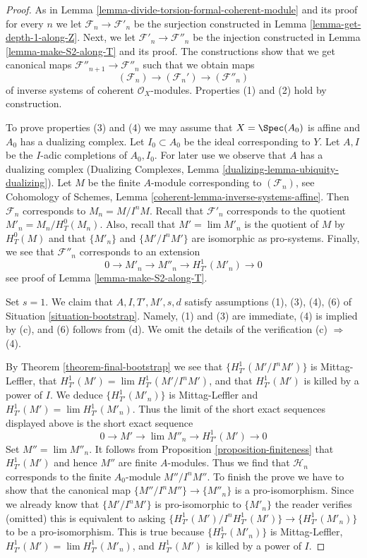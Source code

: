 \begin{proof}
As in Lemma \ref{lemma-divide-torsion-formal-coherent-module} and its proof
for every $n$ we let $\mathcal{F}_n \to \mathcal{F}'_n$ be the surjection
constructed in Lemma \ref{lemma-get-depth-1-along-Z}.
Next, we let $\mathcal{F}'_n \to \mathcal{F}''_n$ be the injection
constructed in Lemma \ref{lemma-make-S2-along-T} and its proof.
The constructions show that we get canonical maps
$\mathcal{F}''_{n + 1} \to \mathcal{F}''_n$ such that we obtain
maps
$$
(\mathcal{F}_n) \longrightarrow (\mathcal{F}_n') \longrightarrow
(\mathcal{F}''_n)
$$
of inverse systems of coherent $\mathcal{O}_X$-modules.
Properties (1) and (2) hold by construction.

\medskip\noindent
To prove properties (3) and (4) we may assume that $X = \Spec(A_0)$ is
affine and $A_0$ has a dualizing complex. Let $I_0 \subset A_0$ be the
ideal corresponding to $Y$. Let $A, I$ be the $I$-adic completions of
$A_0, I_0$. For later use we observe that $A$ has a dualizing complex
(Dualizing Complexes, Lemma \ref{dualizing-lemma-ubiquity-dualizing}).
Let $M$ be the finite $A$-module corresponding to $(\mathcal{F}_n)$, see
Cohomology of Schemes, Lemma \ref{coherent-lemma-inverse-systems-affine}.
Then $\mathcal{F}_n$ corresponds to $M_n = M/I^nM$. Recall that
$\mathcal{F}'_n$ corresponds to the quotient $M'_n = M_n / H^0_T(M_n)$.
Also, recall that $M' = \lim M'_n$ is the quotient of $M$ by
$H^0_T(M)$ and that $\{M'_n\}$ and $\{M'/I^nM'\}$ are isomorphic
as pro-systems. Finally, we see that $\mathcal{F}''_n$ corresponds
to an extension
$$
0 \to M'_n \to M''_n \to H^1_{T'}(M'_n) \to 0
$$
see proof of Lemma \ref{lemma-make-S2-along-T}.

\medskip\noindent
Set $s = 1$. We claim that $A, I, T', M', s, d$ satisfy assumptions
(1), (3), (4), (6) of Situation \ref{situation-bootstrap}. Namely, (1) and (3)
are immediate, (4) is implied by (c), and (6) follows from (d).
We omit the details of the verification (c) $\Rightarrow$ (4).

\medskip\noindent
By Theorem \ref{theorem-final-bootstrap} we see that $\{H^1_{T'}(M'/I^nM')\}$
is Mittag-Leffler, that $H^1_{T'}(M') = \lim H^1_{T'}(M'/I^nM')$, and that
$H^1_{T'}(M')$ is killed by a power of $I$. We deduce
$\{H^1_{T'}(M'_n)\}$ is Mittag-Leffler and $H^1_{T'}(M') = \lim H^1_{T'}(M'_n)$.
Thus the limit of the short exact sequences displayed above
is the short exact sequence
$$
0 \to M' \to \lim M''_n \to H^1_{T'}(M') \to 0
$$
Set $M'' = \lim M''_n$. It follows from
Proposition \ref{proposition-finiteness} that $H^1_{T'}(M')$
and hence $M''$ are finite $A$-modules.
Thus we find that $\mathcal{H}_n$ corresponds to
the finite $A_0$-module $M''/I^nM''$. To finish the prove we have to show
that the canonical map $\{M''/I^nM''\} \to \{M''_n\}$ is a pro-isomorphism.
Since we already know that $\{M'/I^nM'\}$ is pro-isomorphic to
$\{M'_n\}$ the reader verifies (omitted) this is equivalent to asking
$\{H^1_{T'}(M')/I^nH^1_{T'}(M')\} \to \{H^1_{T'}(M'_n)\}$
to be a pro-isomorphism. This is true because $\{H^1_{T'}(M'_n)\}$
is Mittag-Leffler, $H^1_{T'}(M') = \lim H^1_{T'}(M'_n)$, and
$H^1_{T'}(M')$ is killed by a power of $I$.
\end{proof}

